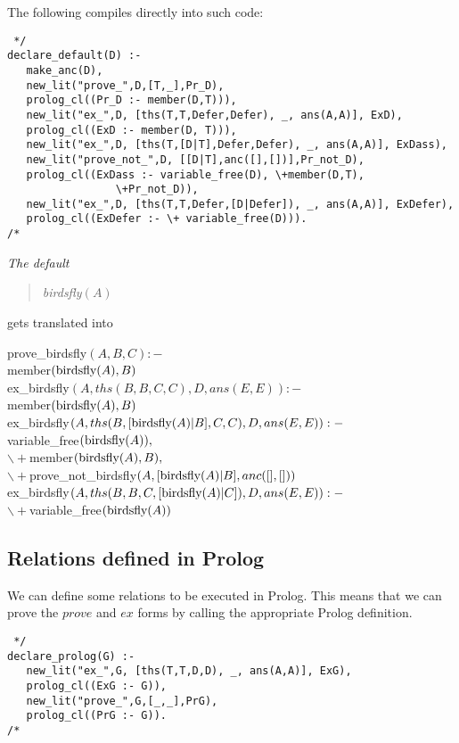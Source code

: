 The following compiles directly into such code:
\begin{verbatim} */
declare_default(D) :-
   make_anc(D),
   new_lit("prove_",D,[T,_],Pr_D),
   prolog_cl((Pr_D :- member(D,T))),
   new_lit("ex_",D, [ths(T,T,Defer,Defer), _, ans(A,A)], ExD),
   prolog_cl((ExD :- member(D, T))),
   new_lit("ex_",D, [ths(T,[D|T],Defer,Defer), _, ans(A,A)], ExDass),
   new_lit("prove_not_",D, [[D|T],anc([],[])],Pr_not_D),
   prolog_cl((ExDass :- variable_free(D), \+member(D,T),
                 \+Pr_not_D)),
   new_lit("ex_",D, [ths(T,T,Defer,[D|Defer]), _, ans(A,A)], ExDefer),
   prolog_cl((ExDefer :- \+ variable_free(D))).
/* \end{verbatim}

\begin{example}\em
The default
\begin{quote} \em
birdsfly$(A)$
\end{quote}
gets translated into \em
\begin{prolog}
prove\_birdsfly$(A,B,C):-$\\
\>member$(\hbox{birdsfly}(A),B)$\\
ex\_birdsfly$(A,ths(B,B,C,C),D,ans(E,E)):-$\\
\>member$(\hbox{birdsfly}(A),B)$\\
ex\_birdsfly$(A,ths(B,[\hbox{birdsfly}(A)|B],C,C),D,ans(E,E)):-$\\
\>variable\_free$(\hbox{birdsfly}(A)) ,$\\
\>$\backslash+$member$(\hbox{birdsfly}(A),B),$\\
\>$\backslash+$prove\_not\_birdsfly$(A,[\hbox{birdsfly}(A)|B],anc([],[]))$\\
ex\_birdsfly$(A,ths(B,B,C,[\hbox{birdsfly}(A)|C]),D,ans(E,E)):- $\\
\>$\backslash+$variable\_free$(\hbox{birdsfly}( A))$
\end{prolog}
\end{example}
\subsection{Relations defined in Prolog}
We can define some relations to be executed in Prolog.
This means that we can prove the $prove$ and $ex$ forms by calling 
the appropriate Prolog definition.
\begin{verbatim} */
declare_prolog(G) :-
   new_lit("ex_",G, [ths(T,T,D,D), _, ans(A,A)], ExG),
   prolog_cl((ExG :- G)),
   new_lit("prove_",G,[_,_],PrG),
   prolog_cl((PrG :- G)).
/* \end{verbatim}

